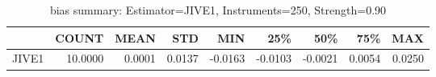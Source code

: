 \begin{table}[ht]
\centering
\caption{bias summary: Estimator=JIVE1, Instruments=250, Strength=0.90}
\begin{tabular}{lrrrrrrrr}
\toprule
 & COUNT & MEAN & STD & MIN & 25\% & 50\% & 75\% & MAX \\
\midrule
JIVE1 & 10.0000 & 0.0001 & 0.0137 & -0.0163 & -0.0103 & -0.0021 & 0.0054 & 0.0250 \\
\bottomrule
\end{tabular}
\end{table}
